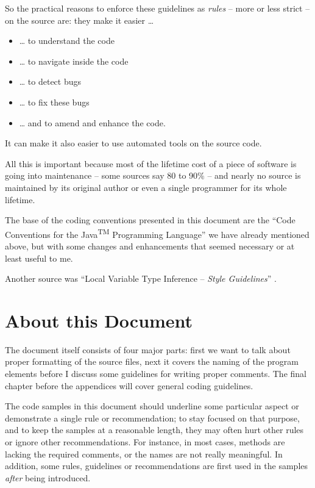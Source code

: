 So the practical reasons to enforce these guidelines as \textit{rules} – more or less strict – on the source are: they make it easier …
\begin{itemize}[nosep]
\item … to understand the code
\item … to navigate inside the code
\item … to detect bugs
\item … to fix these bugs
\item … and to amend and enhance the code.
\end{itemize}

It can make it also easier to use automated tools on the source code.

All this is important because most of the lifetime cost of a piece of software is going into maintenance – some sources say 80 to 90\% – and nearly no source is maintained by its original author or even a single programmer for its whole lifetime.

The base of the coding conventions presented in this document are the “Code Conventions for the Java\textsuperscript{TM} Programming Language” \autocite{SUN_CODE_CONVENTIONS} we have already mentioned above, but with some changes and enhancements that seemed necessary or at least useful to me.

Another source was “Local Variable Type Inference – \textit{Style Guidelines}” \autocite{Marks:LocalVariableTypeInference}.

\section{About this Document}
The document itself consists of four major parts: first we want to talk about proper formatting of the source files, next it covers the naming of the program elements before I discuss some guidelines for writing proper comments. The final chapter before the appendices will cover general coding guidelines.

The code samples in this document should underline some particular aspect or demonstrate a single rule or recommendation; to stay focused on that purpose, and to keep the samples at a reasonable length, they may often hurt other rules or ignore other recommendations. For instance, in most cases, methods are lacking the required comments, or the names are not really meaningful. In addition, some rules, guidelines or recommendations are first used in the samples \textit{after} being introduced.

